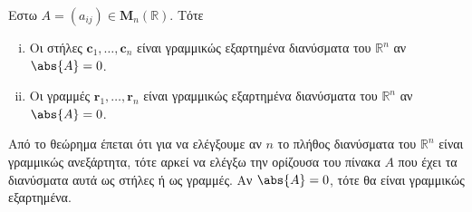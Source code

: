 \documentclass[a4paper,table]{report}
\begin{document}
\begin{prop}
  Εστω $ A = (a_{ij}) \in \textbf{M}_{n}(\mathbb{R}) $. Τότε 
  \begin{enumerate}[i)]
    \item Οι στήλες $ \mathbf{c}_{1}, \ldots, \mathbf{c}_{n} $ είναι γραμμικώς 
      εξαρτημένα διανύσματα του $ \mathbb{R}^{n} $ αν $ \abs{A} = 0 $.
    \item Οι γραμμές $ \mathbf{r}_{1}, \ldots, \mathbf{r}_{n} $ είναι γραμμικώς 
      εξαρτημένα διανύσματα του $ \mathbb{R}^{n} $ αν $ \abs{A} = 0 $.
  \end{enumerate}
\end{prop}

\begin{rem}
  Από το θεώρημα έπεται ότι για να ελέγξουμε αν $ n $ το πλήθος διανύσματα 
  του $ \mathbb{R}^{n} $ είναι γραμμικώς ανεξάρτητα, τότε αρκεί να ελέγξω την 
  ορίζουσα του πίνακα $A$ που έχει τα διανύσματα αυτά ως στήλες ή ως γραμμές. 
  Αν $ \abs{A} = 0 $, τότε θα είναι γραμμικώς εξαρτημένα.
\end{rem}

 
\end{document}
